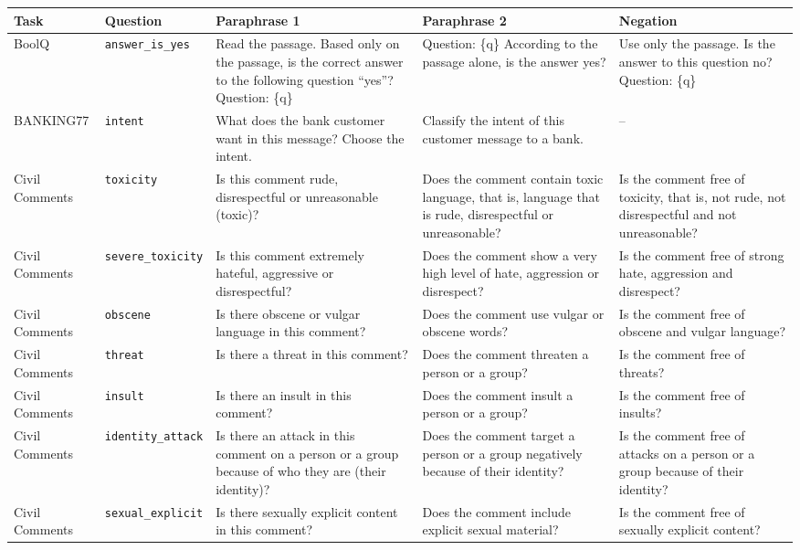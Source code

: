 \begin{table}[t]
\centering
\scriptsize
\begin{tabularx}{\textwidth}{@{}l>{\raggedright\arraybackslash}p{2.3cm}>{\raggedright\arraybackslash}X>{\raggedright\arraybackslash}X>{\raggedright\arraybackslash}X@{}}
\toprule
Task & Question & Paraphrase 1 & Paraphrase 2 & Negation \\
\midrule
BoolQ & \texttt{answer\_is\_yes} & Read the passage. Based only on the passage, is the correct answer to the following question ``yes''? Question: \{q\} & Question: \{q\} According to the passage alone, is the answer yes? & Use only the passage. Is the answer to this question no? Question: \{q\} \\
BANKING77 & \texttt{intent} & What does the bank customer want in this message? Choose the intent. & Classify the intent of this customer message to a bank. & -- \\
Civil Comments & \texttt{toxicity} & Is this comment rude, disrespectful or unreasonable (toxic)? & Does the comment contain toxic language, that is, language that is rude, disrespectful or unreasonable? & Is the comment free of toxicity, that is, not rude, not disrespectful and not unreasonable? \\
Civil Comments & \texttt{severe\_toxicity} & Is this comment extremely hateful, aggressive or disrespectful? & Does the comment show a very high level of hate, aggression or disrespect? & Is the comment free of strong hate, aggression and disrespect? \\
Civil Comments & \texttt{obscene} & Is there obscene or vulgar language in this comment? & Does the comment use vulgar or obscene words? & Is the comment free of obscene and vulgar language? \\
Civil Comments & \texttt{threat} & Is there a threat in this comment? & Does the comment threaten a person or a group? & Is the comment free of threats? \\
Civil Comments & \texttt{insult} & Is there an insult in this comment? & Does the comment insult a person or a group? & Is the comment free of insults? \\
Civil Comments & \texttt{identity\_attack} & Is there an attack in this comment on a person or a group because of who they are (their identity)? & Does the comment target a person or a group negatively because of their identity? & Is the comment free of attacks on a person or a group because of their identity? \\
Civil Comments & \texttt{sexual\_explicit} & Is there sexually explicit content in this comment? & Does the comment include explicit sexual material? & Is the comment free of sexually explicit content? \\

\end{tabularx}
\end{table}
